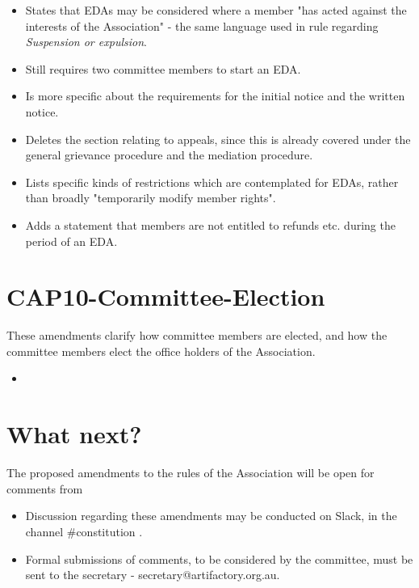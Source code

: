 \documentclass[../constitution.tex]{subfiles}
\begin{document}
\begin{itemize}
    \item States that EDAs may be considered where a member "has acted against the interests of the Association" - the same language used in rule \label{suspension-or-expulsion} regarding \textit{Suspension or expulsion}.
    \item Still requires two committee members to start an EDA.
    \item Is more specific about the requirements for the initial notice and the written notice.
    \item Deletes the section relating to appeals, since this is already covered under the general grievance procedure and the mediation procedure.
    \item Lists specific kinds of restrictions which are contemplated for EDAs, rather than broadly "temporarily modify member rights".
    \item Adds a statement that members are not entitled to refunds etc. during the period of an EDA.
\end{itemize}

\section*{CAP10-Committee-Election}

These amendments clarify how committee members are elected, and how the committee members elect the office holders of the Association.

\begin{itemize}
    \item {}
\end{itemize}

\section*{What next?}

The proposed amendments to the rules of the Association will be open for comments from 

\begin{itemize}
    \item Discussion regarding these amendments may be conducted on Slack, in the channel \#constitution .
    \item Formal submissions of comments, to be considered by the committee, must be sent to the secretary - secretary@artifactory.org.au.
\end{itemize}
\end{document}
